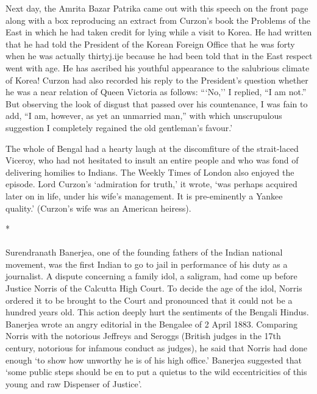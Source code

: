 Next day, the Amrita Bazar Patrika came out with this speech on the front page along with a box reproducing an extract from Curzon's book the Problems of the East in which he had taken credit for lying while a visit to Korea. He had written that he had told the President of the Korean Foreign Office that he was forty when he was actually thirtyj.ije because he had been told that in the East respect went with age. He has ascribed his youthful appearance to the salubrious climate of Korea! Curzon had also recorded his reply to the President's question whether he was a near relation of Queen Victoria as follows: ```No,'' I replied, ``I am not.'' But observing the look of disgust that passed over his countenance, I was fain to add, ``I am, however, as yet an unmarried man,'' with which unscrupulous suggestion I completely regained the old gentleman's favour.'

The whole of Bengal had a hearty laugh at the discomfiture of the strait-laced Viceroy, who had not hesitated to insult an entire people and who was fond of delivering homilies to Indians. The Weekly Times of London also enjoyed the episode. Lord Curzon's `admiration for truth,' it wrote, `was perhaps acquired later on in life, under his wife's management. It is pre-eminently a Yankee quality.' (Curzon's wife was an American heiress).

\begin{center}*\end{center}

\paragraph*{}


Surendranath Banerjea, one of the founding fathers of the Indian national movement, was the first Indian to go to jail in performance of his duty as a journalist. A dispute concerning a family idol, a saligram, had come up before Justice Norris of the Calcutta High Court. To decide the age of the idol, Norris ordered it to be brought to the Court and pronounced that it could not be a hundred years old. This action deeply hurt the sentiments of the Bengali Hindus. Banerjea wrote an angry editorial in the Bengalee of 2 April 1883. Comparing Norris with the notorious Jeffreys and Seroggs (British judges in the 17th century, notorious for infamous conduct as judges), he said that Norris had done enough `to show how unworthy he is of his high office.' Banerjea suggested that `some public steps should be en to put a quietus to the wild eccentricities of this young and raw Dispenser of Justice'.

